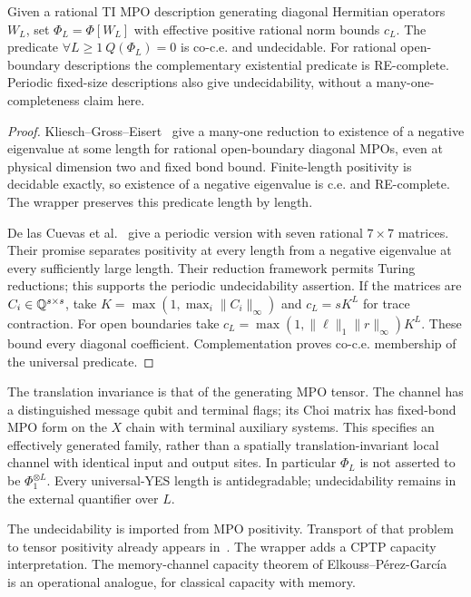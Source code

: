 \begin{corollary}\label{cor:mpo}
Given a rational TI MPO description generating diagonal Hermitian
operators $W_L$, set $\Phi_L=\Phi[W_L]$ with effective positive rational
norm bounds $c_L$. The predicate $\forall L\geq1\ Q(\Phi_L)=0$ is co-c.e.
and undecidable. For rational open-boundary descriptions the complementary
existential predicate is RE-complete. Periodic fixed-size descriptions
also give undecidability, without a many-one-completeness claim here.
\end{corollary}
\begin{proof}
Kliesch--Gross--Eisert~\cite[Theorem~5 and Lemmas~11--12]{KGE} give a
many-one reduction to existence of a negative eigenvalue at some length for rational
open-boundary diagonal MPOs, even at physical dimension two and fixed
bond bound. Finite-length positivity is decidable exactly, so existence
of a negative eigenvalue is c.e. and RE-complete. The wrapper preserves
this predicate length by length.

De las Cuevas et al.~\cite[Problem~2 and Lemma~3]{DCCWP} give a periodic
version with seven rational $7\times7$ matrices. Their promise separates
positivity at every length from a negative eigenvalue at every sufficiently large
length. Their reduction framework permits Turing reductions; this
supports the periodic undecidability assertion. If the matrices are
$C_i\in\mathbb Q^{s\times s}$, take
$K=\max(1,\max_i\|C_i\|_\infty)$ and $c_L=sK^L$ for trace contraction.
For open boundaries take
$c_L=\max(1,\|\ell\|_1\|r\|_\infty)K^L$. These bound every diagonal
coefficient. Complementation proves co-c.e. membership of the universal
predicate.
\end{proof}

The translation invariance is that of the generating MPO tensor.
The channel has a distinguished message qubit and terminal flags; its
Choi matrix has fixed-bond MPO form on the $X$ chain with terminal
auxiliary systems. This specifies an effectively generated family,
rather than a spatially translation-invariant local channel with
identical input and output sites. In particular $\Phi_L$ is not asserted
to be $\Phi_1^{\otimes L}$. Every universal-YES length is antidegradable;
undecidability remains in the external quantifier over $L$.

\begin{remark}[Attribution]
The undecidability is imported from MPO positivity. Transport of that
problem to tensor positivity already appears in~\cite{VNC}. The wrapper
adds a CPTP capacity interpretation. The memory-channel capacity theorem
of Elkouss--P\'erez-Garc\'ia~\cite{EPG} is an operational analogue, for
classical capacity with memory.
\end{remark}
